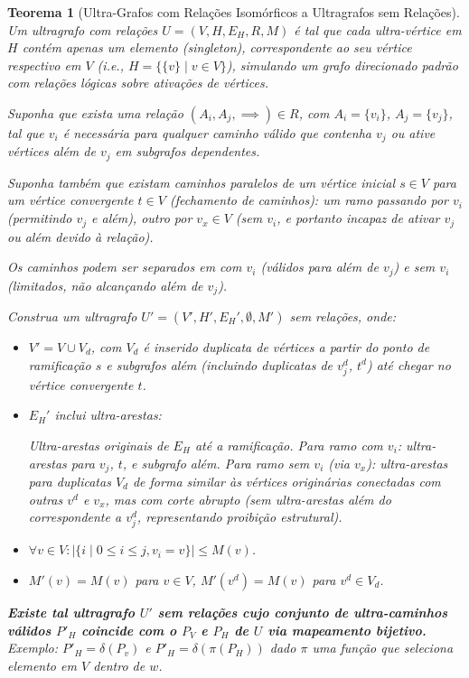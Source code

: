 \documentclass{article}
\newtheorem{theorem}{Teorema}
\begin{document}
\begin{theorem}[Ultra-Grafos com Relações Isomórficos a Ultragrafos sem Relações]
Um ultragrafo com relações \( U = (V, H, E_H, R, M) \) é tal que cada ultra-vértice em \( H \) contém apenas um elemento (singleton), correspondente ao seu vértice respectivo em \( V \) (i.e., \( H = \{ \{v\} \mid v \in V \} \)), simulando um grafo direcionado padrão com relações lógicas sobre ativações de vértices.

Suponha que exista uma relação \( (A_i, A_j, \implies) \in R \), com \( A_i = \{v_i\} \), \( A_j = \{v_j\} \), tal que \( v_i \) é necessária para qualquer caminho válido que contenha \( v_j \) ou ative vértices além de \( v_j \) em subgrafos dependentes.

Suponha também que existam caminhos paralelos de um vértice inicial \( s \in V \) para um vértice convergente \( t \in V \) (fechamento de caminhos): um ramo passando por \( v_i \) (permitindo \( v_j \) e além), outro por \( v_x \in V \) (sem \( v_i \), e portanto incapaz de ativar \( v_j \) ou além devido à relação).

Os caminhos podem ser separados em com \( v_i \) (válidos para além de \( v_j \)) e sem \( v_i \) (limitados, não alcançando além de \( v_j \)).

Construa um ultragrafo \( U' = (V', H', E_H', \emptyset, M') \) sem relações, onde:

\begin{itemize}
    \item \( V' = V \cup V_d \), com \( V_d \) é inserido duplicata de vértices a partir do ponto de ramificação \( s \) e subgrafos além (incluindo duplicatas de \( v_j^d \), \( t^d \)) até chegar no vértice convergente \( t \).
    \item \( E_H' \) inclui ultra-arestas:

    \subitem Ultra-arestas originais de \( E_H \) até a ramificação.
    \subitem Para ramo com \( v_i \): ultra-arestas para \( v_j \), \( t \), e subgrafo além.
    \subitem Para ramo sem \( v_i \) (via \( v_x \)): ultra-arestas para duplicatas \( V_d \) de forma similar às vértices originárias conectadas com outras \( v^d \) e \( v_x \), mas com corte abrupto (sem ultra-arestas além do correspondente a \( v_j^d \), representando proibição estrutural).

    \item \( \forall v \in V: |\{ i \mid 0 \leq i \leq j, v_i = v \}| \leq M(v) \).
    \item \( M'(v) = M(v) \) para \( v \in V \), \( M'(v^d) = M(v) \) para \( v^d \in V_d \).
\end{itemize}


\textbf{Existe tal ultragrafo \( U' \) sem relações cujo conjunto de ultra-caminhos válidos \( P'_H \) coincide com o \( P_V \) e \( P_H \) de \( U \) via mapeamento bijetivo.}
\\
Exemplo: \( P'_H = \delta(P_v) \) e \( P'_H = \delta(\pi(P_H)) \) dado \( \pi \) uma função que seleciona elemento em \( V \) dentro de \( w \).
\end{theorem}
\end{document}
